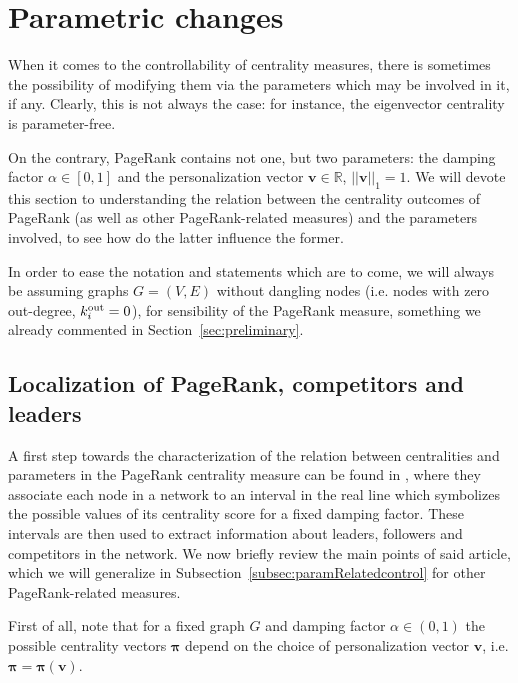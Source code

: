 \documentclass[sn-mathphys-ay]{sn-jnl}%
\newcommand{\R}{\mathbb{R}}
\newcommand{\bv}{\bm{v}}
\theoremstyle{thmstyleone}%
\theoremstyle{thmstyletwo}%
\theoremstyle{thmstylethree}%
\begin{document}
\section{Parametric changes}\label{sec:paramcontrol}

When it comes to the controllability of centrality measures, there is sometimes the possibility of modifying them via the parameters which may be involved in it, if any. Clearly, this is not always the case: for instance, the eigenvector centrality is parameter-free. 

On the contrary, PageRank contains not one, but two parameters: the damping factor $\alpha\in[0,1]$ and the personalization vector $\bv\in\R$, $||\bv||_1=1$. We will devote this section to understanding the relation between the centrality outcomes of PageRank (as well as other PageRank-related measures) and the parameters involved, to see how do the latter influence the former.

In order to ease the notation and statements which are to come, we will always be assuming graphs $G=(V,E)$ without dangling nodes (i.e. nodes with zero out-degree, $k_i^{\rm out}=0$), for sensibility of the PageRank measure, something we already commented in Section~\ref{sec:preliminary}. 


\subsection{Localization of PageRank, competitors and leaders} \label{subsec:PRlocalization}

A first step towards the characterization of the relation between centralities and parameters in the PageRank centrality measure can be found in \cite{garcia2012localization}, where they associate each node in a network to an interval in the real line which symbolizes the possible values of its centrality score for a fixed damping factor. These intervals are then used to extract information about leaders, followers and competitors in the network. We now briefly review the main points of said article, which we will generalize in Subsection~\ref{subsec:paramRelatedcontrol} for other PageRank-related measures.


First of all, note that for a fixed graph $G$ and damping factor $\alpha\in(0,1)$ the possible centrality vectors $\bm{\pi}$ depend on the choice of personalization vector $\bm{v}$, i.e. $\bm{\pi}=\bm{\pi}(\bm{v})$. 
\end{document}
